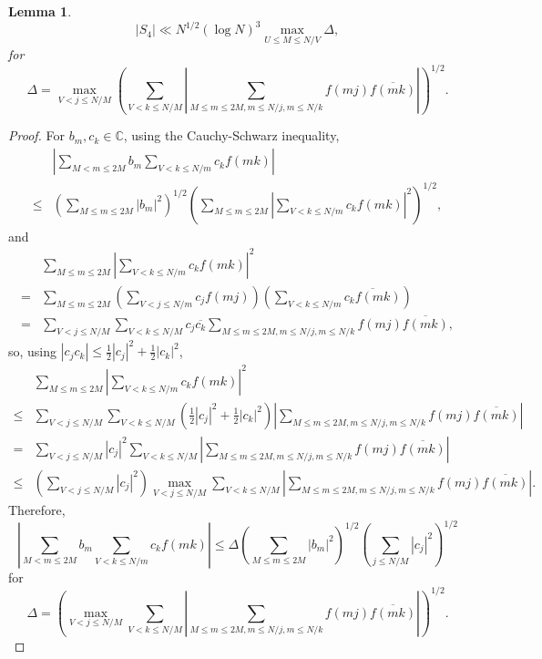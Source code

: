 \documentclass{article}
\newtheorem{lemma}[theorem]{Lemma}
\theoremstyle{definition}
\begin{document}
\begin{lemma}
\[
|S_4| \ll N^{1/2} (\log N)^3  \max_{U \leq M \leq N/V} \Delta,
\]
for
\[
\Delta = \max_{V<j\leq N/M} \left(  \sum_{V<k \leq N/M} \left|  \sum_{M \leq m \leq 2M, m\leq N/j, m \leq N/k} f(mj) \overline{f(mk)}\right| \right)^{1/2}.
\]
\end{lemma}
\begin{proof}
For $b_m,c_k \in \mathbb{C}$, using the Cauchy-Schwarz inequality,
\[
\begin{split}
&\left| \sum_{M<m\leq 2M} b_m \sum_{V < k \leq N/m} c_k f(mk) \right|\\
\leq&\left( \sum_{M \leq m \leq 2M} |b_m|^2 \right)^{1/2} \left( \sum_{M \leq m \leq 2M} \left|  \sum_{V < k \leq N/m} c_k f(mk)\right|^2 \right)^{1/2},
\end{split}
\]
and
\[
\begin{split}
& \sum_{M \leq m \leq 2M} \left|  \sum_{V < k \leq N/m} c_k f(mk)\right|^2\\
=& \sum_{M \leq m \leq 2M} 
 \left(\sum_{V < j \leq N/m} c_j f(mj)\right) \left(\sum_{V < k \leq N/m} \overline{c_k f(mk)}\right)\\
=&\sum_{V<j \leq N/M}  \sum_{V<k \leq N/M}c_j \overline{c_k} \sum_{M \leq m \leq 2M, m\leq N/j, m \leq N/k} f(mj) \overline{f(mk)},
\end{split}
\]
so, using $|c_j c_k| \leq \frac{1}{2}|c_j|^2+\frac{1}{2}|c_k|^2$,
\[
\begin{split}
& \sum_{M \leq m \leq 2M} \left|  \sum_{V < k \leq N/m} c_k f(mk)\right|^2\\
\leq& \sum_{V<j \leq N/M}  \sum_{V<k \leq N/M} \left(  \frac{1}{2}|c_j|^2+\frac{1}{2}|c_k|^2\right)
\left|  \sum_{M \leq m \leq 2M, m\leq N/j, m \leq N/k} f(mj) \overline{f(mk)}\right|\\
=& \sum_{V<j \leq N/M}  |c_j|^2   \sum_{V<k \leq N/M} \left|  \sum_{M \leq m \leq 2M, m\leq N/j, m \leq N/k} f(mj) \overline{f(mk)}\right|\\
\leq&\left(  \sum_{V<j \leq N/M}  |c_j|^2  \right) \max_{V<j\leq N/M}  \sum_{V<k \leq N/M} \left|  \sum_{M \leq m \leq 2M, m\leq N/j, m \leq N/k} f(mj) \overline{f(mk)}\right|.
\end{split}
\]
Therefore,
\[
\left| \sum_{M<m\leq 2M} b_m \sum_{V < k \leq N/m} c_k f(mk) \right|
\leq
\Delta \left( \sum_{M \leq m \leq 2M} |b_m|^2 \right)^{1/2} \left(  \sum_{j \leq N/M}  |c_j|^2  \right)^{1/2}
\]
for
\[
\Delta =\left( \max_{V<j\leq N/M}  \sum_{V<k \leq N/M} \left|  \sum_{M \leq m \leq 2M, m\leq N/j, m \leq N/k} f(mj) \overline{f(mk)}\right| \right)^{1/2}.
\]


\end{proof}
\end{document}
